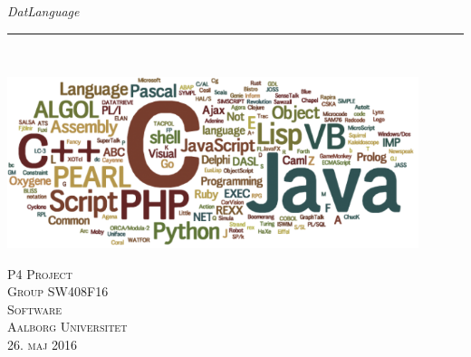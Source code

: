\thispagestyle{empty}
\begin{flushright}
\vspace{3cm}

\phantom{hul}

\phantom{hul}

\phantom{hul}

\textsl{\Huge DatLanguage} \\ \vspace{1cm}

\rule{13cm}{3mm} \\ \vspace{1.5cm}
\vspace{1cm}

\includegraphics[width=0.9\textwidth]{billeder/Prog-languages}

\vspace{7cm} 
\textsc{\Large P4 Project \\
Group SW408F16 \\
Software\\
Aalborg Universitet\\
26. maj 2016\\}
\end{flushright}
